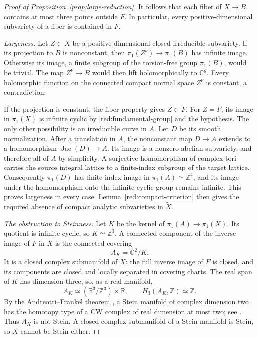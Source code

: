 \documentclass[11pt,reqno]{amsart}
\numberwithin{equation}{section}
\theoremstyle{definition}
\theoremstyle{remark}
\newcommand{\C}{\mathbb C}
\newcommand{\R}{\mathbb R}
\newcommand{\Z}{\mathbb Z}
\DeclareMathOperator{\Jac}{Jac}
\begin{document}
\begin{proof}[Proof of Proposition~\ref{prop:large-reduction}]
It follows that each fiber of $X\to B$ contains at most three points
outside $F$.  In particular, every positive-dimensional subvariety of
a fiber is contained in $F$.

\smallskip
\noindent\emph{Largeness.}
Let $Z\subset X$ be a positive-dimensional closed irreducible
subvariety.  If its projection to $B$ is nonconstant, then
$\pi_1(Z^\nu)\to\pi_1(B)$ has infinite image.  Otherwise its image,
a finite subgroup of the torsion-free group $\pi_1(B)$, would be
trivial.  The map $Z^\nu\to B$ would then lift holomorphically to
$\C^g$.  Every holomorphic function on the connected compact normal
space $Z^\nu$ is constant, a contradiction.

If the projection is constant, the fiber property gives $Z\subset F$.
For $Z=F$, its image in $\pi_1(X)$ is infinite cyclic by
\eqref{red:fundamental-group} and the hypothesis.  The only other
possibility is an irreducible curve in $A$.  Let $D$ be its smooth
normalization.  After a translation in $A$, the nonconstant map
$D\to A$ extends to a homomorphism $\Jac(D)\to A$.  Its image is a
nonzero abelian subvariety, and therefore all of $A$ by simplicity.
A surjective homomorphism of complex tori carries the source integral
lattice to a finite-index subgroup of the target lattice.  Consequently
$\pi_1(D)$ has finite-index image in $\pi_1(A)\simeq\Z^4$, and its
image under the homomorphism onto the infinite cyclic group remains
infinite.  This proves largeness in every case.  Lemma~\ref{red:compact-criterion}
then gives the required absence of compact analytic subvarieties in
$\widetilde X$.

\smallskip
\noindent\emph{The obstruction to Steinness.}
Let $K$ be the kernel of $\pi_1(A)\to\pi_1(X)$.  Its quotient is
infinite cyclic, so $K\simeq\Z^3$.  A connected component of the
inverse image of $F$ in $\widetilde X$ is the connected covering
\[
 A_K=\C^2/K.
\]
It is a closed complex submanifold of $\widetilde X$: the full inverse
image of $F$ is closed, and its components are closed and locally
separated in covering charts.  The real span of $K$ has dimension
three, so, as a real manifold,
\[
 A_K\simeq(\R^3/\Z^3)\times\R,
 \qquad H_3(A_K,\Z)\simeq\Z.
\]
By the Andreotti--Frankel theorem \cite{AndreottiFrankel1959}, a Stein
manifold of complex dimension two has the homotopy type of a CW complex of real dimension at most
two; see \cite[Theorem~7.2]{MilnorMorse}.  Thus $A_K$ is not Stein.
A closed complex submanifold of a Stein manifold is Stein, so
$\widetilde X$ cannot be Stein either.
\end{proof}
\end{document}

